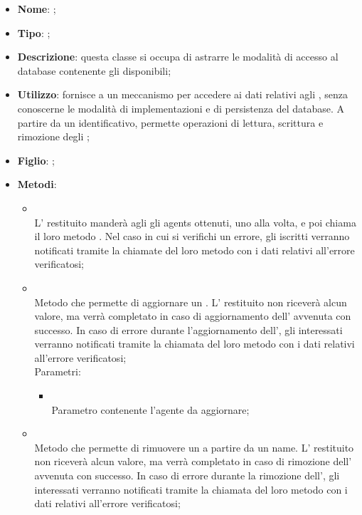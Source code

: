 \begin{itemize}
	\item \textbf{Nome}: ;
	\item \textbf{Tipo}: ;
	\item \textbf{Descrizione}: questa classe si occupa di astrarre le modalità di accesso al database contenente gli  disponibili;
	\item \textbf{Utilizzo}: fornisce a  un meccanismo per accedere ai dati relativi agli , senza conoscerne le modalità di implementazioni e di persistenza del database. A partire da un identificativo, permette operazioni di lettura, scrittura e rimozione degli ;
	\item \textbf{Figlio}: ;
	\item \textbf{Metodi}:
	\begin{itemize}
		\item[]  \\		L' restituito manderà agli  gli agents ottenuti, uno alla volta, e poi chiama il loro metodo . Nel caso in cui si verifichi un errore, gli  iscritti verranno notificati tramite la chiamate del loro metodo  con i dati relativi all'errore verificatosi;\\
		\item[]  \\		Metodo che permette di aggiornare un .  L' restituito non riceverà alcun valore, ma verrà completato in caso di aggiornamento dell' avvenuta con successo. In caso di errore durante l'aggiornamento dell', gli  interessati verranno notificati tramite la chiamata del loro metodo  con i dati relativi all'errore verificatosi;\\
		Parametri:
		\begin{itemize}
			\item {} \\
			Parametro contenente l'agente da aggiornare;
		\end{itemize}
		\item[]  \\		Metodo che permette di rimuovere un  a partire da un name. L' restituito non riceverà alcun valore, ma verrà completato in caso di rimozione dell' avvenuta con successo. In caso di errore durante la rimozione dell', gli  interessati verranno notificati tramite la chiamata del loro metodo  con i dati relativi all'errore verificatosi;\\

\end{itemize}
\end{itemize}
